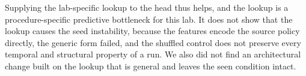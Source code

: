 Supplying the lab-specific lookup to the head thus helps, and the
lookup is a procedure-specific predictive bottleneck for this lab. It does not show
that the lookup causes the seed instability, because the features
encode the source policy directly, the generic form failed, and the
shuffled control does not preserve every temporal and structural
property of a run. We also did not find an architectural change built
on the lookup that is general and leaves the seen condition intact.

